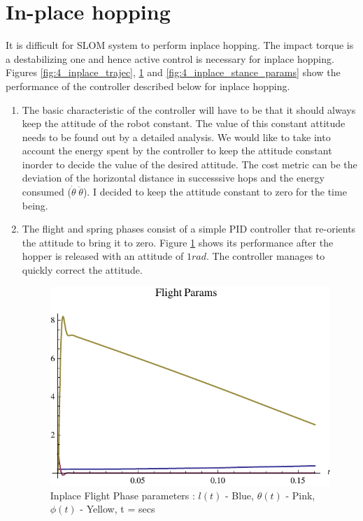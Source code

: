 \section{In-place hopping}
It is difficult for SLOM system to perform inplace hopping. The impact torque is a destabilizing one and hence active control is necessary for inplace hopping. Figures \ref{fig:4_inplace_trajec}, \ref{fig:4_inplace_flight_params} and \ref{fig:4_inplace_stance_params} show the performance of the controller described below for inplace hopping.
\begin{enumerate}
 \item
  The basic characteristic of the controller will have to be that it should always keep the attitude of the robot constant. The value of this constant attitude needs to be found out by a detailed analysis. We would like to take into account the energy spent by the controller to keep the attitude constant inorder to decide the value of the desired attitude. The cost metric can be the deviation of the horizontal distance in successsive hops and the energy consumed ($\dot{\theta}\;\ddot{\theta}$). I decided to keep the attitude constant to zero for the time being.
  \item
  The flight and spring phases consist of a simple PID controller that re-orients the attitude to bring it to zero. Figure \ref{fig:4_inplace_flight_params} shows its performance after the hopper is released with an attitude of $1 rad$. The controller manages to quickly correct the attitude.
\begin{figure}[H]
\centering
\includegraphics[scale=0.8]{fig/inplace_pFlight_params.pdf}
\caption{Inplace Flight Phase parameters : $l(t)$ - Blue, $\theta(t)$ - Pink, $\phi(t)$ - Yellow, t = secs}
\label{fig:4_inplace_flight_params}
\end{figure}


\end{enumerate}
